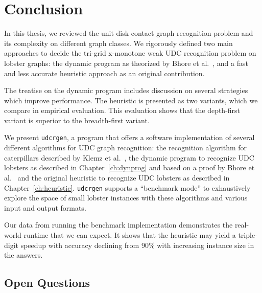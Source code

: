 
\chapter{Conclusion}

In this thesis, we reviewed the unit disk contact graph recognition problem and its complexity on different graph classes. We rigorously defined two main approaches to decide the tri-grid x-monotone weak UDC recognition problem on lobster graphs: the dynamic program as theorized by Bhore et al.~\cite{Bhore2021}, and a fast and less accurate heuristic approach as an original contribution.

The treatise on the dynamic program includes discussion on several strategies which improve performance. The heuristic is presented as two variants, which we compare in empirical evaluation. This evaluation shows that the depth-first variant is superior to the breadth-first variant.

We present \texttt{udcrgen}, a program that offers a software implementation of several different algorithms for UDC graph recognition: the recognition algorithm for caterpillars described by Klemz et al.~\cite{Klemz2015}, the dynamic program to recognize UDC lobsters as described in Chapter~\ref{ch:dynprog} and based on a proof by Bhore et al.~\cite{Bhore2021} and the original heuristic to recognize UDC lobsters as described in Chapter~\ref{ch:heuristic}. \texttt{udcrgen} supports a ``benchmark mode'' to exhaustively explore the space of small lobster instances with these algorithms and various input and output formats.

Our data from running the benchmark implementation demonstrates the real-world runtime that we can expect. It shows that the heuristic may yield a triple-digit speedup with accuracy declining from $90\%$ with increasing instance size in the answers.

\section{Open Questions}

